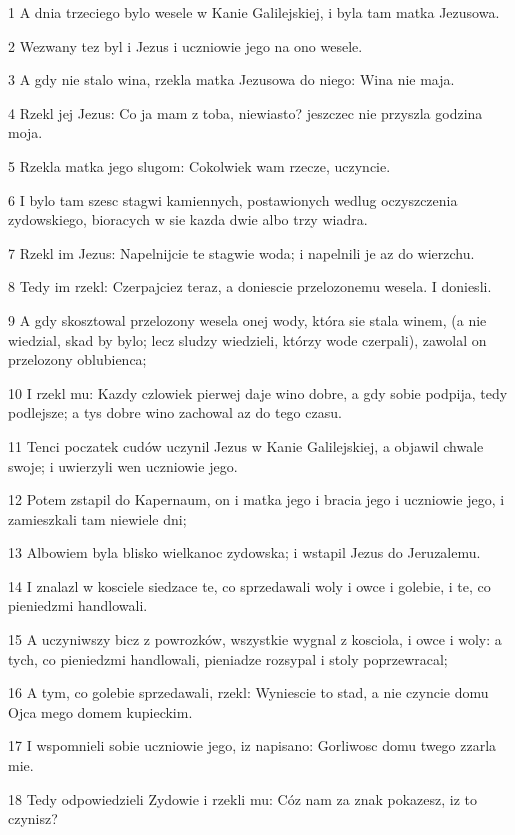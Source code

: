 \par 1 A dnia trzeciego bylo wesele w Kanie Galilejskiej, i byla tam matka Jezusowa.
\par 2 Wezwany tez byl i Jezus i uczniowie jego na ono wesele.
\par 3 A gdy nie stalo wina, rzekla matka Jezusowa do niego: Wina nie maja.
\par 4 Rzekl jej Jezus: Co ja mam z toba, niewiasto? jeszczec nie przyszla godzina moja.
\par 5 Rzekla matka jego slugom: Cokolwiek wam rzecze, uczyncie.
\par 6 I bylo tam szesc stagwi kamiennych, postawionych wedlug oczyszczenia zydowskiego, bioracych w sie kazda dwie albo trzy wiadra.
\par 7 Rzekl im Jezus: Napelnijcie te stagwie woda; i napelnili je az do wierzchu.
\par 8 Tedy im rzekl: Czerpajciez teraz, a doniescie przelozonemu wesela. I doniesli.
\par 9 A gdy skosztowal przelozony wesela onej wody, która sie stala winem, (a nie wiedzial, skad by bylo; lecz sludzy wiedzieli, którzy wode czerpali), zawolal on przelozony oblubienca;
\par 10 I rzekl mu: Kazdy czlowiek pierwej daje wino dobre, a gdy sobie podpija, tedy podlejsze; a tys dobre wino zachowal az do tego czasu.
\par 11 Tenci poczatek cudów uczynil Jezus w Kanie Galilejskiej, a objawil chwale swoje; i uwierzyli wen uczniowie jego.
\par 12 Potem zstapil do Kapernaum, on i matka jego i bracia jego i uczniowie jego, i zamieszkali tam niewiele dni;
\par 13 Albowiem byla blisko wielkanoc zydowska; i wstapil Jezus do Jeruzalemu.
\par 14 I znalazl w kosciele siedzace te, co sprzedawali woly i owce i golebie, i te, co pieniedzmi handlowali.
\par 15 A uczyniwszy bicz z powrozków, wszystkie wygnal z kosciola, i owce i woly: a tych, co pieniedzmi handlowali, pieniadze rozsypal i stoly poprzewracal;
\par 16 A tym, co golebie sprzedawali, rzekl: Wyniescie to stad, a nie czyncie domu Ojca mego domem kupieckim.
\par 17 I wspomnieli sobie uczniowie jego, iz napisano: Gorliwosc domu twego zzarla mie.
\par 18 Tedy odpowiedzieli Zydowie i rzekli mu: Cóz nam za znak pokazesz, iz to czynisz?
